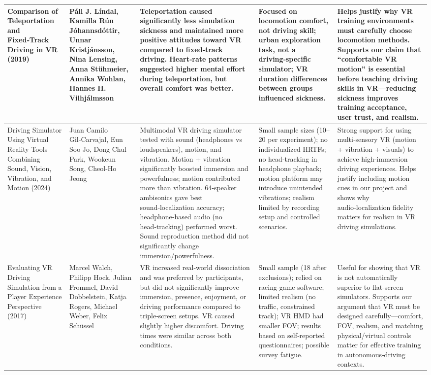 {\begin{longtable}{|p{}|p{}|>{\raggedright\arraybackslash}p{}|>{\raggedright\arraybackslash}p{}|>{\raggedright\arraybackslash}p{}|}
Comparison of Teleportation and Fixed‑Track Driving in VR (2019)~\cite{Lindal2019} & Páll J. Líndal, Kamilla Rún Jóhannsdóttir, Unnar Kristjánsson, Nina Lensing, Anna Stühmeier, Annika Wohlan, Hannes H. Vilhjálmsson & Teleportation caused significantly less simulation sickness and maintained more positive attitudes toward VR compared to fixed‑track driving. Heart‑rate patterns suggested higher mental effort during teleportation, but overall comfort was better. & Focused on locomotion comfort, not driving skill; urban exploration task, not a driving‑specific simulator; VR duration differences between groups influenced sickness. & Helps justify why VR training environments must carefully choose locomotion methods. Supports our claim that “comfortable VR motion” is essential before teaching driving skills in VR—reducing sickness improves training acceptance, user trust, and realism. \\ \hline
Driving Simulator Using Virtual Reality Tools Combining Sound, Vision, Vibration, and Motion (2024)~\cite{GilCarvajal2024} & Juan Camilo Gil‑Carvajal, Eun Soo Jo, Dong Chul Park, Wookeun Song, Cheol‑Ho Jeong & Multimodal VR driving simulator tested with sound (headphones vs loudspeakers), motion, and vibration. Motion + vibration significantly boosted immersion and powerfulness; motion contributed more than vibration. 64‑speaker ambisonics gave best sound‑localization accuracy; headphone‑based audio (no head‑tracking) performed worst. Sound reproduction method did not significantly change immersion/powerfulness. & Small sample sizes (10–20 per experiment); no individualized HRTFs; no head‑tracking in headphone playback; motion platform may introduce unintended vibrations; realism limited by recording setup and controlled scenarios. & Strong support for using multi‑sensory VR (motion + vibration + visuals) to achieve high‑immersion driving experiences. Helps justify including motion cues in our project and shows why audio‑localization fidelity matters for realism in VR driving simulations. \\ \hline
Evaluating VR Driving Simulation from a Player Experience Perspective (2017)~\cite{Walch2017} & Marcel Walch, Philipp Hock, Julian Frommel, David Dobbelstein, Katja Rogers, Michael Weber, Felix Schüssel & VR increased real‑world dissociation and was preferred by participants, but did not significantly improve immersion, presence, enjoyment, or driving performance compared to triple‑screen setups. VR caused slightly higher discomfort. Driving times were similar across both conditions. & Small sample (18 after exclusions); relied on racing‑game software; limited realism (no traffic, constrained track); VR HMD had smaller FOV; results based on self‑reported questionnaires; possible survey fatigue. & Useful for showing that VR is not automatically superior to flat‑screen simulators. Supports our argument that VR must be designed carefully—comfort, FOV, realism, and matching physical/virtual controls matter for effective training in autonomous‑driving contexts. \\ \hline

\end{longtable}}
